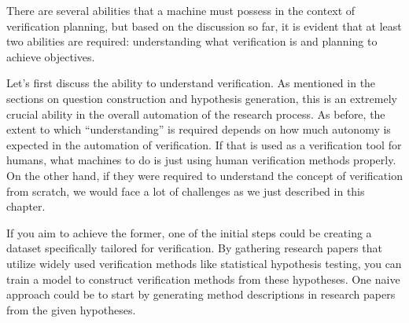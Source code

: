 \documentclass{book}
\begin{document}


There are several abilities that a machine must possess in the context of verification planning, but based on the discussion so far, it is evident that at least two abilities are required: understanding what verification is and planning to achieve objectives.

Let's first discuss the ability to understand verification. As mentioned in the sections on question construction and hypothesis generation, this is an extremely crucial ability in the overall automation of the research process. As before, the extent to which ``understanding'' is required depends on how much autonomy is expected in the automation of verification. If that is used as a verification tool for humans, what machines to do is just using human verification methods properly. On the other hand, if they were required to understand the concept of verification from scratch, we would face a lot of challenges as we just described in this chapter. 

If you aim to achieve the former, one of the initial steps could be creating a dataset specifically tailored for verification. By gathering research papers that utilize widely used verification methods like statistical hypothesis testing, you can train a model to construct verification methods from these hypotheses. One naive approach could be to start by generating method descriptions in research papers from the given hypotheses. 
\end{document}
